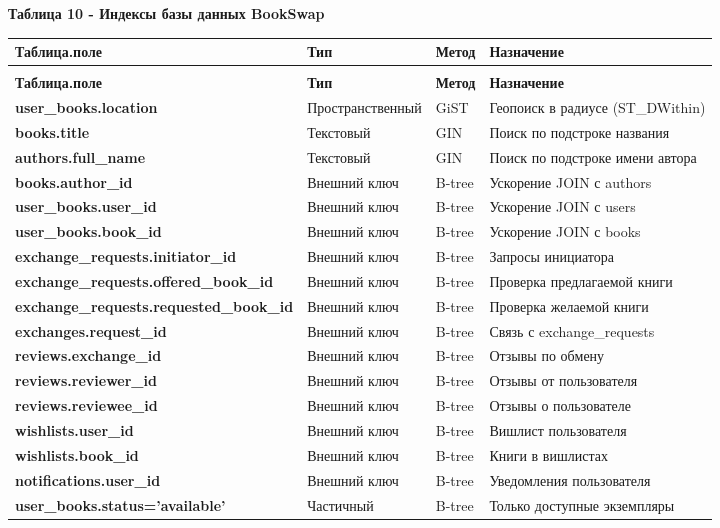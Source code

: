 \documentclass[14pt,a4paper]{extarticle}
\begin{document}
\textbf{Таблица 10 - Индексы базы данных BookSwap}

\begin{longtable}[c]{@{}
  >{\raggedright\arraybackslash\hspace{0pt}}p{}
  >{\raggedright\arraybackslash\hspace{0pt}}p{}
  >{\centering\arraybackslash}p{}
  >{\raggedright\arraybackslash\hspace{0pt}}p{}@{}}
\toprule
\textbf{Таблица.поле} & \textbf{Тип} & \textbf{Метод} & \textbf{Назначение} \\
\midrule
\endfirsthead
\multicolumn{4}{l}{\textit{Продолжение таблицы 10}} \\
\toprule
\textbf{Таблица.поле} & \textbf{Тип} & \textbf{Метод} & \textbf{Назначение} \\
\midrule
\endhead
\bottomrule
\endlastfoot
\textbf{user\_books.location} & Пространственный & GiST & Геопоиск в радиусе (ST\_DWithin) \\
\textbf{books.title} & Текстовый & GIN & Поиск по подстроке названия \\
\textbf{authors.full\_name} & Текстовый & GIN & Поиск по подстроке имени автора \\
\textbf{books.author\_id} & Внешний ключ & B-tree & Ускорение JOIN с authors \\
\textbf{user\_books.user\_id} & Внешний ключ & B-tree & Ускорение JOIN с users \\
\textbf{user\_books.book\_id} & Внешний ключ & B-tree & Ускорение JOIN с books \\
\textbf{exchange\_requests.initiator\_id} & Внешний ключ & B-tree & Запросы инициатора \\
\textbf{exchange\_requests.offered\_book\_id} & Внешний ключ & B-tree & Проверка предлагаемой книги \\
\textbf{exchange\_requests.requested\_book\_id} & Внешний ключ & B-tree & Проверка желаемой книги \\
\textbf{exchanges.request\_id} & Внешний ключ & B-tree & Связь с exchange\_requests \\
\textbf{reviews.exchange\_id} & Внешний ключ & B-tree & Отзывы по обмену \\
\textbf{reviews.reviewer\_id} & Внешний ключ & B-tree & Отзывы от пользователя \\
\textbf{reviews.reviewee\_id} & Внешний ключ & B-tree & Отзывы о пользователе \\
\textbf{wishlists.user\_id} & Внешний ключ & B-tree & Вишлист пользователя \\
\textbf{wishlists.book\_id} & Внешний ключ & B-tree & Книги в вишлистах \\
\textbf{notifications.user\_id} & Внешний ключ & B-tree & Уведомления пользователя \\
\textbf{user\_books.status='available'} & Частичный & B-tree & Только доступные экземпляры \\
\end{longtable}
\end{document}
